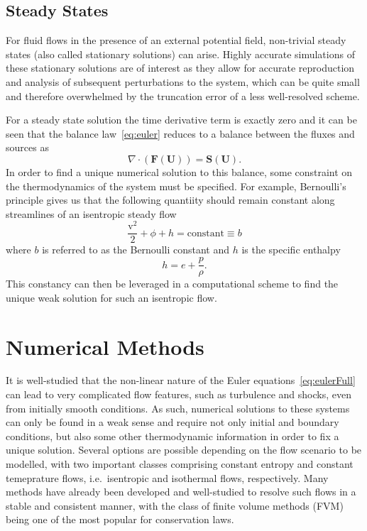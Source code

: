 \subsection{Steady States}

For fluid flows in the presence of an external potential field, non-trivial steady states (also called stationary solutions) can arise. Highly accurate simulations of these stationary solutions are of interest as they allow for accurate reproduction and analysis of subsequent perturbations to the system, which can be quite small and therefore overwhelmed by the truncation error of a less well-resolved scheme.

For a steady state solution the time derivative term is exactly zero and it can be seen that the balance law~\eqref{eq:euler} reduces to a balance between the fluxes and sources as
\begin{equation} \label{eq:balance}
\nabla\cdot(\mathbf{F}(\mathbf{U}))=\mathbf{S}(\mathbf{U}).
\end{equation}
In order to find a unique numerical solution to this balance, some constraint on the thermodynamics of the system must be specified. For example, Bernoulli's principle gives us that the following quantiity should remain constant along streamlines of an isentropic steady flow
\begin{equation}
\frac{\mathrm{v}^2}{2}+\phi+h=\textrm{constant}\equiv b
\end{equation}
where $b$ is referred to as the Bernoulli constant and $h$ is the specific enthalpy
\begin{equation} \label{eq:enthalpy}
h=e+\frac{p}{\rho}.
\end{equation}
This constancy can then be leveraged in a computational scheme to find the unique weak solution for such an isentropic flow.


\section{Numerical Methods}
\label{sec:numerics}

It is well-studied that the non-linear nature of the Euler equations~\eqref{eq:eulerFull} can lead to very complicated flow features, such as turbulence and shocks, even from initially smooth conditions. As such, numerical solutions to these systems can only be found in a weak sense and require not only initial and boundary conditions, but also some other thermodynamic information in order to fix a unique solution. Several options are possible depending on the flow scenario to be modelled, with two important classes comprising constant entropy and constant temeprature flows, i.e.~isentropic and isothermal flows, respectively. Many methods have already been developed and well-studied to resolve such flows in a stable and consistent manner, with the class of finite volume methods (FVM) being one of the most popular for conservation laws.

